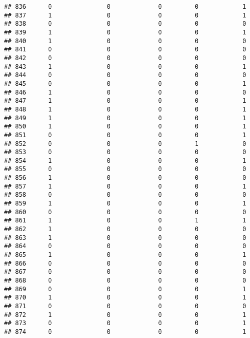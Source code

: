 \documentclass[]{article}
\begin{document}
\begin{verbatim}
## 836      0               0             0         0            1
## 837      1               0             0         0            1
## 838      0               0             0         0            0
## 839      1               0             0         0            1
## 840      1               0             0         0            0
## 841      0               0             0         0            0
## 842      0               0             0         0            0
## 843      1               0             0         0            1
## 844      0               0             0         0            0
## 845      0               0             0         0            1
## 846      1               0             0         0            0
## 847      1               0             0         0            1
## 848      1               0             0         0            1
## 849      1               0             0         0            1
## 850      1               0             0         0            1
## 851      0               0             0         0            1
## 852      0               0             0         1            0
## 853      0               0             0         0            0
## 854      1               0             0         0            1
## 855      0               0             0         0            0
## 856      1               0             0         0            0
## 857      1               0             0         0            1
## 858      0               0             0         0            0
## 859      1               0             0         0            1
## 860      0               0             0         0            0
## 861      1               0             0         1            1
## 862      1               0             0         0            0
## 863      1               0             0         0            0
## 864      0               0             0         0            0
## 865      1               0             0         0            1
## 866      0               0             0         0            0
## 867      0               0             0         0            0
## 868      0               0             0         0            0
## 869      0               0             0         0            1
## 870      1               0             0         0            1
## 871      0               0             0         0            0
## 872      1               0             0         0            1
## 873      0               0             0         0            1
## 874      0               0             0         0            1

\end{verbatim}
\end{document}
